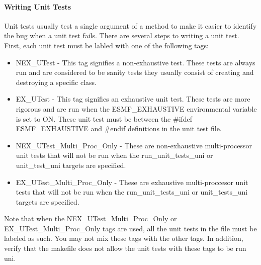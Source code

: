 \paragraph{Writing Unit Tests}

Unit tests usually test a single argument of a method to make it easier to
identify the bug when a unit test fails.
There are several steps to writing a unit test.
First, each unit test must be labled with one of the following tags:
\begin{itemize}
\item NEX\_UTest - This tag signifies a non-exhaustive test. These tests are always run and
are considered to be sanity tests they usually consist of creating and destroying a specific class.
\item EX\_UTest - This tag signifies an exhaustive unit test. These tests are more rigorous and
are run when the ESMF\_EXHAUSTIVE environmental variable is set to ON. These unit test must be between the \#ifdef ESMF\_EXHAUSTIVE
and \#endif definitions in the unit test file.
\item NEX\_UTest\_Multi\_Proc\_Only - These are non-exhaustive multi-processor unit tests that will not be
run when the run\_unit\_tests\_uni or unit\_test\_uni targets are specified.
\item EX\_UTest\_Multi\_Proc\_Only - These are exhaustive multi-proccesor unit tests that will not be
run when the run\_unit\_tests\_uni or unit\_tests\_uni targets are specified.
\end{itemize}
Note that when the NEX\_UTest\_Multi\_Proc\_Only or EX\_UTest\_Multi\_Proc\_Only tags are used, all the unit tests in
the file must be labeled as such. You may not mix these tags with the other tags. In addition, verify that the makefile
does not allow the unit tests with these tags to be run uni.

